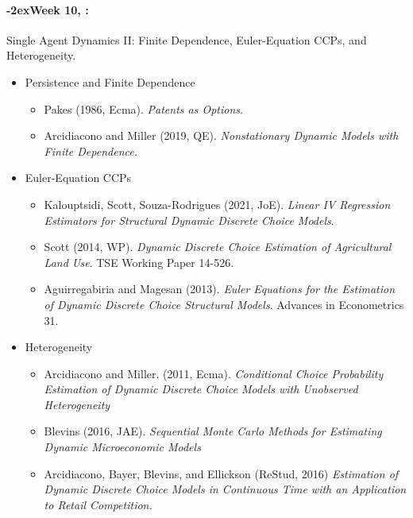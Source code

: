 \documentclass[11pt]{article}
\newcommand{\week}[1]{%
  \sbox{\weekdatebox}{\syldate{\today}}%
  \paragraph*{\kern-2ex\quad #1, \usebox{\weekdatebox}:}%
  \AdvanceDate[7]%
}
\begin{document}
\week{Week 10} Single Agent Dynamics II: Finite Dependence, Euler-Equation CCPs, and Heterogeneity.
\begin{itemize}
\item Persistence and Finite Dependence
\begin{itemize}
\item Pakes (1986, Ecma). \textit{Patents as Options}.
\item Arcidiacono and Miller (2019, QE). \textit{Nonstationary Dynamic Models with Finite Dependence.}
\end{itemize}
\item Euler-Equation CCPs
\begin{itemize}
\item Kalouptsidi, Scott, Souza-Rodrigues (2021, JoE). \textit{Linear IV Regression Estimators for Structural Dynamic Discrete Choice Models}.
\item Scott (2014, WP). \textit{Dynamic Discrete Choice Estimation of Agricultural Land Use}. TSE Working Paper 14-526.
\item Aguirregabiria and Magesan (2013). \textit{Euler Equations for the Estimation of Dynamic Discrete Choice Structural Models}. Advances in Econometrics 31.
\end{itemize}
\item Heterogeneity
\begin{itemize}
\item Arcidiacono and Miller. (2011, Ecma). \textit{Conditional Choice Probability Estimation of Dynamic Discrete Choice Models with Unobserved Heterogeneity}
\item Blevins (2016, JAE). \textit{Sequential Monte Carlo Methods for Estimating Dynamic Microeconomic Models}
\item Arcidiacono, Bayer, Blevins, and Ellickson (ReStud, 2016) \textit{Estimation of Dynamic Discrete Choice Models in Continuous Time with an Application to Retail Competition.}
\end{itemize}
\end{itemize}
\end{document}

